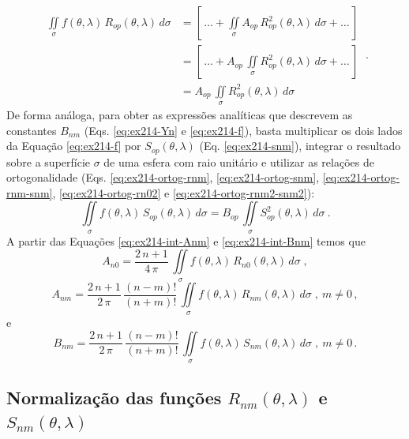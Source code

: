 \documentclass[10pt,a4paper,fleqn]{article}
\begin{document}
\begin{equation}
\begin{split}
\iint \limits_{\sigma} 
f(\theta,\lambda) \, R_{op}(\theta,\lambda) \, d \sigma
& = \left[ \, \hdots + 
\iint \limits_{\sigma} A_{op} \, R_{op}^{2}(\theta,\lambda) \, d \sigma
+ \hdots \, \right] \\
& = \left[ \, \hdots + 
A_{op} \, \iint \limits_{\sigma} R_{op}^{2}(\theta,\lambda) \, d \sigma
+ \hdots \, \right] \\
& = 
A_{op} \, \iint \limits_{\sigma} R_{op}^{2}(\theta,\lambda) \, d \sigma
\end{split} \: .
\label{eq:ex214-int-Anm}
\end{equation}
De forma an\'{a}loga, para obter as expressões analíticas que descrevem as 
constantes $B_{nm}$ (Eqs. \ref{eq:ex214-Yn} e \ref{eq:ex214-f}), basta multiplicar os 
dois lados da Equa\c{c}ão \ref{eq:ex214-f} por $S_{op}(\theta,\lambda)$ (Eq. \ref{eq:ex214-snm}), integrar o resultado sobre a 
superf\'{i}cie $\sigma$ de uma esfera com raio unit\'{a}rio e utilizar as rela\c{c}\~{o}es de ortogonalidade 
(Eqs. \ref{eq:ex214-ortog-rnm}, \ref{eq:ex214-ortog-snm}, \ref{eq:ex214-ortog-rnm-snm}, \ref{eq:ex214-ortog-rn02} e 
\ref{eq:ex214-ortog-rnm2-snm2}):
\begin{equation}
\iint \limits_{\sigma} 
f(\theta,\lambda) \, S_{op}(\theta,\lambda) \, d \sigma
= B_{op} \, \iint \limits_{\sigma} S_{op}^{2}(\theta,\lambda) \, d \sigma \: .
\label{eq:ex214-int-Bnm}
\end{equation}
A partir das Equa\c{c}\~{o}es \ref{eq:ex214-int-Anm} e \ref{eq:ex214-int-Bnm} temos que
\begin{equation}
A_{n0} = \dfrac{2 \, n + 1}{4 \, \pi} \, 
\iint \limits_{\sigma} 
f(\theta,\lambda) \, R_{n0}(\theta,\lambda) \, d \sigma \; ,
\label{eq:ex214-An0}
\end{equation}
\begin{equation}
A_{nm} = \dfrac{2 \, n + 1}{2 \, \pi} \, \dfrac{(n - m)!}{(n + m)!} \,
\iint \limits_{\sigma} 
f(\theta,\lambda) \, R_{nm}(\theta,\lambda) \, d \sigma \; , \: m \neq 0 \, ,
\label{eq:ex214-Anm}
\end{equation}
e
\begin{equation}
B_{nm} = \dfrac{2 \, n + 1}{2 \, \pi} \, \dfrac{(n - m)!}{(n + m)!} \,
\iint \limits_{\sigma} 
f(\theta,\lambda) \, S_{nm}(\theta,\lambda) \, d \sigma \; , \: m \neq 0 \, .
\label{eq:ex214-Bnm}
\end{equation}

\subsection{Normaliza\c{c}\~{a}o das fun\c{c}\~{o}es $R_{nm}(\theta, \lambda)$ e $S_{nm}(\theta, \lambda)$}
\end{document}
